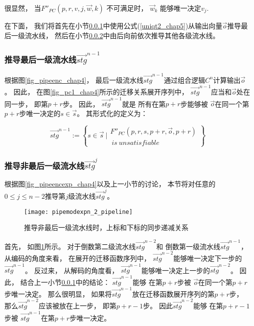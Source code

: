 很显然，
当$F''_{PC}(p,r,v,j,\vec{w},k)$ 不可满足时，
$\vec{w}_k$ 能够唯一决定$v_j$.

在下面，
我们将首先在小节\ref{subsub_last}中使用公式(\ref{uniqt2_chap5})从输出向量$\vec{o}$推导最后一级流水线，
然后在小节\ref{subsub_notlast}中由后向前依次推导其他各级流水线。

\subsubsection{推导最后一级流水线$\vec{stg}^{n-1}$}\label{subsub_last}
根据图\ref{fig_pipeenc_chap4}，
最后一级流水线$\vec{stg}^{n-1}$通过组合逻辑$C^n$计算输出$\vec{o}$。
因此，
在图\ref{fig_pc1_chap4}所示的迁移关系展开序列中，
$\vec{stg}^{n-1}$应当和$\vec{o}$处在同一步，
即第$p+r$步。
因此，
$\vec{stg}^{n-1}$就是
所有在第$p+r$步能够被
$\vec{o}$在同一个第$p+r$步唯一决定的$s\in \vec{s}$。
其形式化的定义为：

\begin{equation}\label{stgn_1}
 \vec{stg}^{n-1} :=
\left\{
 s\in \vec{s} ~|
\begin{array}{cc}
 F''_{PC}(p,r,
 s,p+r,
 \vec{o},p+r)\\
 ~is~unsatisfiable
\end{array}
\right\}
\end{equation}

\subsubsection{推导非最后一级流水线$\vec{stg}^{j}$}\label{subsub_notlast}

根据图\ref{fig_pipeencexp_chap4}以及上一小节的讨论，
本节将对任意的$0\le j\le n-2$推导第$j$级流水线$\vec{stg}^{j}$。



\begin{figure}[t]
\begin{center}
\texttt{[image: pipemodexpn\_2\_pipeline]}
\end{center}
\caption{推导非最后一级流水线时，上标和下标的同步递减关系}
  \label{fig_pipemodexpn_2_pipeline}
\end{figure}

首先，
如图\ref{fig_pipemodexpn_2_pipeline}所示。
对于倒数第二级流水线$\vec{stg}^{n-2}$和
倒数第一级流水线$\vec{stg}^{n-1}$，
从编码的角度来看，
在展开的迁移函数序列中，
$\vec{stg}^{n-2}$能够唯一决定下一步的$\vec{stg}^{n-1}$。
反过来，
从解码的角度看，
$\vec{stg}^{n-1}$能够唯一决定上一步的$\vec{stg}^{n-2}$。
因此，
结合上一小节\ref{subsub_last}中的结论：
$\vec{stg}^{n-1}$能够
在第$p+r$步被
$\vec{o}$在同一个第$p+r$步唯一决定。
那么很明显，
如果将$\vec{stg}^{n-1}$放在迁移函数展开序列的第$p+r$步，
那么$\vec{stg}^{n-2}$应该被放在上一步，
即第$p+r-1$步。
因此$\vec{stg}^{n-2}$能够
在第$p+r-1$步被
$\vec{stg}^{n-1}$在第$p+r$步唯一决定。

